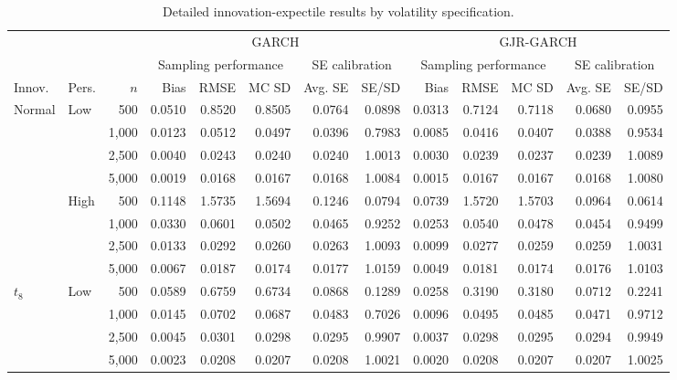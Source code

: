 \begin{table}[!p]
\centering
\caption{Detailed innovation-expectile results by volatility specification.}
\label{tab:mc-xi-detailed}
\scriptsize
\setlength{\tabcolsep}{2.1pt}
\renewcommand{\arraystretch}{1.02}
\begin{tabular}{llr*{10}{r}}
\toprule
&&&\multicolumn{5}{c}{GARCH}&\multicolumn{5}{c}{GJR-GARCH}\\
\cmidrule(lr){4-8}\cmidrule(lr){9-13}
&&&\multicolumn{3}{c}{Sampling performance}&\multicolumn{2}{c}{SE calibration}&\multicolumn{3}{c}{Sampling performance}&\multicolumn{2}{c}{SE calibration}\\
\cmidrule(lr){4-6}\cmidrule(lr){7-8}\cmidrule(lr){9-11}\cmidrule(lr){12-13}
Innov. & Pers. & $n$ & Bias & RMSE & MC SD & Avg. SE & SE/SD & Bias & RMSE & MC SD & Avg. SE & SE/SD\\
\midrule
Normal & Low & 500 & 0.0510 & 0.8520 & 0.8505 & 0.0764 & 0.0898 & 0.0313 & 0.7124 & 0.7118 & 0.0680 & 0.0955\\
 &  & 1,000 & 0.0123 & 0.0512 & 0.0497 & 0.0396 & 0.7983 & 0.0085 & 0.0416 & 0.0407 & 0.0388 & 0.9534\\
 &  & 2,500 & 0.0040 & 0.0243 & 0.0240 & 0.0240 & 1.0013 & 0.0030 & 0.0239 & 0.0237 & 0.0239 & 1.0089\\
 &  & 5,000 & 0.0019 & 0.0168 & 0.0167 & 0.0168 & 1.0084 & 0.0015 & 0.0167 & 0.0167 & 0.0168 & 1.0080\\
\addlinespace[1pt]
 & High & 500 & 0.1148 & 1.5735 & 1.5694 & 0.1246 & 0.0794 & 0.0739 & 1.5720 & 1.5703 & 0.0964 & 0.0614\\
 &  & 1,000 & 0.0330 & 0.0601 & 0.0502 & 0.0465 & 0.9252 & 0.0253 & 0.0540 & 0.0478 & 0.0454 & 0.9499\\
 &  & 2,500 & 0.0133 & 0.0292 & 0.0260 & 0.0263 & 1.0093 & 0.0099 & 0.0277 & 0.0259 & 0.0259 & 1.0031\\
 &  & 5,000 & 0.0067 & 0.0187 & 0.0174 & 0.0177 & 1.0159 & 0.0049 & 0.0181 & 0.0174 & 0.0176 & 1.0103\\
\addlinespace[3pt]
$t_8$ & Low & 500 & 0.0589 & 0.6759 & 0.6734 & 0.0868 & 0.1289 & 0.0258 & 0.3190 & 0.3180 & 0.0712 & 0.2241\\
 &  & 1,000 & 0.0145 & 0.0702 & 0.0687 & 0.0483 & 0.7026 & 0.0096 & 0.0495 & 0.0485 & 0.0471 & 0.9712\\
 &  & 2,500 & 0.0045 & 0.0301 & 0.0298 & 0.0295 & 0.9907 & 0.0037 & 0.0298 & 0.0295 & 0.0294 & 0.9949\\
 &  & 5,000 & 0.0023 & 0.0208 & 0.0207 & 0.0208 & 1.0021 & 0.0020 & 0.0208 & 0.0207 & 0.0207 & 1.0025\\

\end{tabular}
\end{table}
